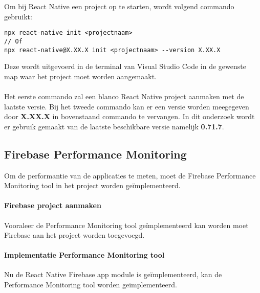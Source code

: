 Om bij React Native een project op te starten, wordt volgend commando gebruikt: 
\begin{verbatim}
npx react-native init <projectnaam>
// Of
npx react-native@X.XX.X init <projectnaam> --version X.XX.X
\end{verbatim}
Deze wordt uitgevoerd in de terminal van Visual Studio Code in de gewenste map waar 
het project moet worden aangemaakt.
\\\\
Het eerste commando zal een blanco React Native project aanmaken met de laatste versie. Bij het tweede commando
kan er een versie worden meegegeven door \textbf{X.XX.X} in bovenstaand commando te vervangen.
In dit onderzoek wordt er gebruik gemaakt van de laatste beschikbare versie namelijk \textbf{0.71.7}.

\subsection{Firebase Performance Monitoring}
Om de performantie van de applicaties te meten, moet de 
Firebase Performance Monitoring tool in het project worden geïmplementeerd.

\paragraph{Firebase project aanmaken}
Vooraleer de Performance Monitoring tool geïmplementeerd kan worden moet Firebase 
aan het project worden toegevoegd.



\paragraph{Implementatie Performance Monitoring tool}
Nu de React Native Firebase app module is geïmplementeerd, kan de 
Performance Monitoring tool worden geïmplementeerd.


